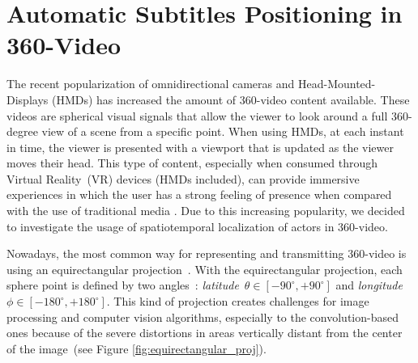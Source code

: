 \section{Automatic Subtitles Positioning in 360-Video}

The recent popularization of omnidirectional cameras and Head-Mounted-Displays (HMDs) has increased the amount of 360-video content available. These videos are spherical visual signals that allow the viewer to look around a full 360-degree view of a scene from a specific point. When using HMDs, at each instant in time, the viewer is presented with a viewport that is updated as the viewer moves their head. This type of content, especially when consumed through Virtual Reality~(VR) devices (HMDs included), can provide immersive experiences in which the user has a strong feeling of presence when compared with the use of traditional media \cite{montagud_culture_2020}. Due to this increasing popularity, we decided to investigate the usage of spatiotemporal localization of actors in 360-video.

Nowadays, the most common way for representing and transmitting 360-video is using an equirectangular projection~\cite{yang2018object}. With the equirectangular projection, each sphere point is defined by two angles~\cite{snyder1987map}: \emph{latitude}~$\theta \in [-90^{\circ}, +90^{\circ}]$ and \emph{longitude}~$\phi \in [-180^{\circ}, +180^{\circ}]$. This kind of projection creates challenges for image processing and computer vision algorithms, especially to the convolution-based ones because of the severe distortions in areas vertically distant from the center of the image~(see Figure \ref{fig:equirectangular_proj}).

